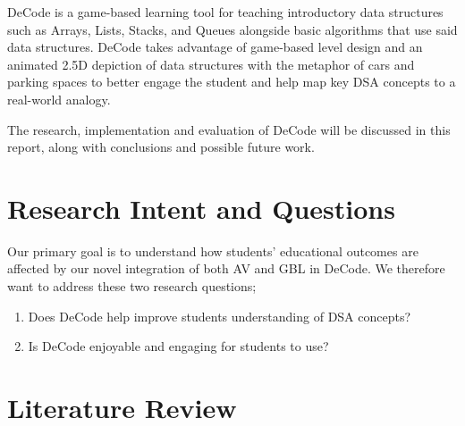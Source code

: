 \documentclass[11pt]{article}
\begin{document}
DeCode is a game-based learning tool for teaching introductory data structures such as Arrays, Lists, Stacks, and Queues alongside basic algorithms that use said data structures. DeCode takes advantage of game-based level design and an animated 2.5D depiction of data structures with the metaphor of cars and parking spaces to better engage the student and help map key DSA concepts to a real-world analogy.\par
The research, implementation and evaluation of DeCode will be discussed in this report, along with conclusions and possible future work.
\section{Research Intent and Questions}
Our primary goal is to understand how students' educational outcomes are affected by our novel integration of both AV and GBL in DeCode. We therefore want to address these two research questions;
\begin{spacing}{1.5}
\begin{enumerate}
  \item Does DeCode help improve students understanding of DSA concepts?
  \item Is DeCode enjoyable and engaging for students to use?
\end{enumerate}
\end{spacing}
\section{Literature Review}
\end{document}

